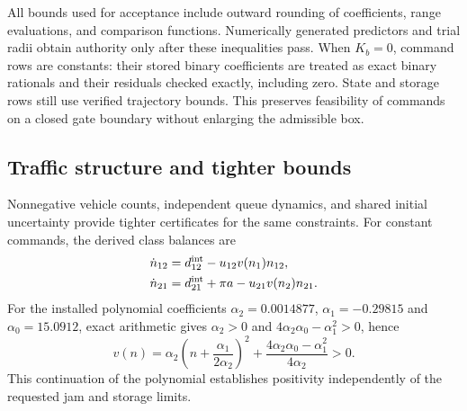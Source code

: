 \documentclass[preprint,12pt]{elsarticle}
\begin{document}
All bounds used for acceptance include outward rounding of coefficients,
range evaluations, and comparison functions. Numerically generated
predictors and trial radii obtain authority only after these inequalities
pass. When $K_b=0$, command rows are constants: their stored binary
coefficients are treated as exact binary rationals and their residuals
checked exactly, including zero. State and storage rows still use verified
trajectory bounds. This preserves feasibility of commands on a closed gate
boundary without enlarging the admissible box.

\subsection{Traffic structure and tighter bounds}
\label{sec:structure-certificate}
\label{app:structure-proof}

Nonnegative vehicle counts, independent queue dynamics, and shared
initial uncertainty provide tighter certificates for the same constraints.
For constant commands, the derived class balances are
\begin{equation}
 \begin{aligned}
 \dot n_{12}&=d^{\rm int}_{12}-u_{12}v(n_1)n_{12},\\
 \dot n_{21}&=d^{\rm int}_{21}+\pi a-u_{21}v(n_2)n_{21}.
 \end{aligned}
 \label{eq:structure-derived-classes}
\end{equation}
For the installed polynomial coefficients $\alpha_2=0.0014877$,
$\alpha_1=-0.29815$ and $\alpha_0=15.0912$, exact arithmetic gives
$\alpha_2>0$ and $4\alpha_2\alpha_0-\alpha_1^2>0$, hence
\begin{equation}
 v(n)=\alpha_2\left(n+\frac{\alpha_1}{2\alpha_2}\right)^2+
                    \frac{4\alpha_2\alpha_0-\alpha_1^2}{4\alpha_2}>0.
 \label{eq:structure-positive-factor}
\end{equation}
This continuation of the polynomial establishes positivity independently
of the requested jam and storage limits.
\end{document}
